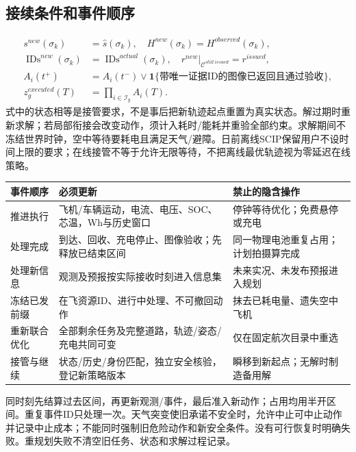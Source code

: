 \subsection*{接续条件和事件顺序}
\begin{align}
 s^{new}(\sigma_k)&=\widehat s(\sigma_k),\quad
 H^{new}(\sigma_k)=H^{observed}(\sigma_k),\\
 \operatorname{IDs}^{new}(\sigma_k)&=\operatorname{IDs}^{actual}(\sigma_k),\quad
 r^{new}|_{\mathcal C^{still\ issued}}=r^{issued},\label{eng:eq:handoverstate}\\
 A_i(t^+)&=A_i(t^-)\lor
  \mathbf1\{\text{带唯一证据ID的图像已返回且通过验收}\},
 \label{eng:eq:taskhistory}\\
 z_g^{executed}(T)&=\prod_{i\in\mathcal I_g}A_i(T).
 \label{eng:eq:executedtower}
\end{align}
\noindent 式中的状态相等是接管要求，不是事后把新轨迹起点重置为真实状态。解过期时重新求解；若局部衔接会改变动作，须计入耗时/能耗并重验全部约束。求解期间不冻结世界时钟，空中等待要耗电且满足天气/避障。日前离线SCIP保留用户不设时间上限的要求；在线接管不等于允许无限等待，不把离线最优轨迹视为零延迟在线策略。
\begin{center}\small
\begin{tabular}{p{.18\linewidth}p{.39\linewidth}p{.33\linewidth}}\toprule
事件顺序 & 必须更新 & 禁止的隐含操作\\\midrule
推进执行 & 飞机/车辆运动，电流、电压、SOC、芯温，Wh与历史窗口 & 停钟等待优化；免费悬停或充电\\
处理完成 & 到达、回收、充电停止、图像验收；先释放已结束区间 & 同一物理电池重复占用；计划拍摄算完成\\
处理新信息 & 观测及预报按实际接收时刻进入信息集 & 未来实况、未发布预报进入规划\\
冻结已发前缀 & 在飞资源ID、进行中处理、不可撤回动作 & 抹去已耗电量、遗失空中飞机\\
重新联合优化 & 全部剩余任务及完整道路，轨迹/姿态/充电共同可变 & 仅在固定航次目录中重选\\
接管与继续 & 状态/历史/身份匹配，独立安全核验，登记新策略版本 & 瞬移到新起点；无解时制造备用解\\\bottomrule
\end{tabular}\end{center}
\noindent 同时刻先结算过去区间，再更新观测/事件，最后准入新动作；占用均用半开区间。重复事件ID只处理一次。天气突变使旧承诺不安全时，允许中止可中止动作并记录中止成本；不能同时强制旧危险动作和新安全条件。没有可行恢复时明确失败。重规划失败不清空旧任务、状态和求解过程记录。
\clearpage
